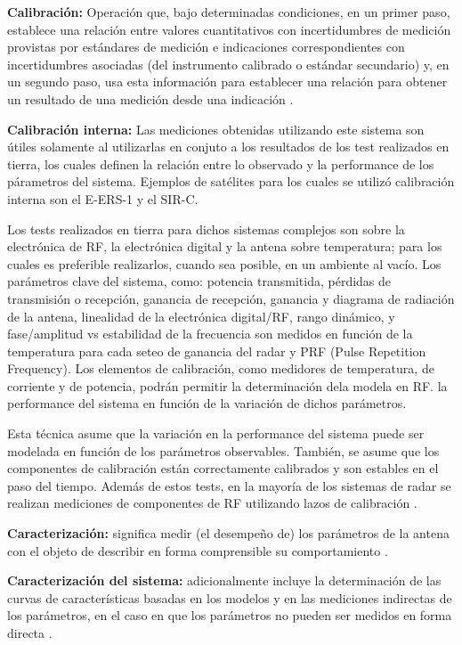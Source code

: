 {\textbf{Calibración:}} Operación que, bajo determinadas condiciones, en un primer paso, establece una relación entre
valores cuantitativos con incertidumbres de medición provistas por estándares de medición e indicaciones correspondientes
con incertidumbres asociadas (del instrumento calibrado o estándar secundario) y, en un segundo paso, usa
esta información para establecer una relación para obtener un resultado de una medición desde una indicación \cite{CalDef}.

{\textbf{Calibración interna:}} Las mediciones obtenidas utilizando este sistema son útiles solamente al utilizarlas en
conjuto a los resultados de los test realizados en tierra, los cuales definen la relación entre lo observado y la
performance de los párametros del sistema. Ejemplos de satélites para los cuales se utilizó calibración interna son el
E-ERS-1 y el SIR-C.

Los tests realizados en tierra para dichos sistemas complejos son sobre la electrónica de RF, la electrónica digital y la
antena sobre temperatura; para los cuales es preferible realizarlos, cuando sea posible, en un ambiente al vacío. Los
parámetros clave del sistema, como: potencia transmitida, pérdidas de transmisión o recepción, ganancia de recepción,
ganancia y diagrama de radiación de la antena, linealidad de la electrónica digital/RF, rango dinámico, y fase/amplitud vs
estabilidad de la frecuencia son medidos en función de la temperatura para cada seteo de ganancia del radar y PRF (Pulse
Repetition Frequency). Los elementos de calibración, como medidores de temperatura, de corriente y de potencia, podrán
permitir la determinación dela modela en RF. la performance del sistema en función de la variación de dichos parámetros.

Esta técnica asume que la variación en la performance del sistema puede ser modelada en función de los parámetros observables.
También, se asume que los componentes de calibración están correctamente calibrados y son estables en el paso del tiempo.
Además de estos tests, en la mayoría de los sistemas de radar se realizan mediciones de componentes de RF utilizando lazos de
calibración \cite{Curlander1991}.

{\textbf{Caracterización:}} significa medir (el desempeño de) los parámetros de la antena con el objeto de describir en
forma comprensible su comportamiento \cite{Mittermayer2007}.

{\textbf{Caracterización del sistema:}} adicionalmente incluye la determinación de las curvas de características basadas
en los modelos y en las mediciones indirectas de los parámetros, en el caso en que los parámetros no pueden ser medidos
en forma directa \cite{Mittermayer2007}.

